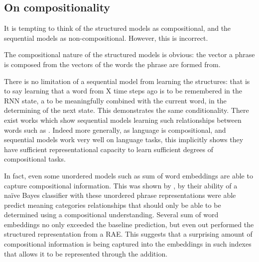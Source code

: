 \documentclass[12pt,parskip]{komatufte}
\begin{document}
\subsection{On compositionality}
 

It is tempting to think of the structured models as compositional,
and the sequential models as non-compositional.
However, this is incorrect.

The compositional nature of the structured models is obvious:
the vector a phrase is composed from the vectors of the words the phrase are formed from.

There is no limitation of a sequential model from learning the structures:
that is to say learning that a word from X time steps ago is to be remembered in the RNN state, a to be meaningfully combined with the current word, in the determining of the next state.
This demonstrates the same conditionality.
There exist works which show sequential models learning such relationships between words such as .
Indeed more generally, as language is compositional, and sequential models work very well on language tasks, this implicitly shows they have sufficient representational capacity to learn sufficient degrees of compositional tasks.

In fact, even some unordered models such as sum of word embeddings are able to capture compositional information.
This was shown by \textcite{RitterPosition}, by their ability of a na\"ive Bayes classifier with these unordered phrase representations were able predict meaning categories relationships that should only be able to be determined using a compositional understanding.
Several  sum of word embeddings no only exceeded the baseline prediction, but even out performed the structured representation from a RAE.
This suggests that a surprising amount of compositional information is being captured into the embeddings in such indexes that allows it to be represented through the addition.

 
\end{document}
